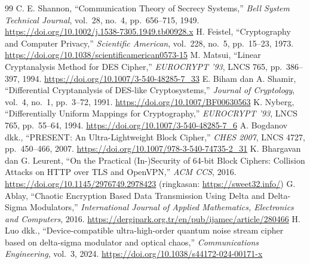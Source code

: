 \begin{thebibliography}{99}
   C. E. Shannon, ``Communication Theory of Secrecy Systems,'' \textit{Bell System Technical Journal}, vol.~28, no.~4, pp.~656--715, 1949. \url{https://doi.org/10.1002/j.1538-7305.1949.tb00928.x}
   H. Feistel, ``Cryptography and Computer Privacy,'' \textit{Scientific American}, vol.~228, no.~5, pp.~15--23, 1973. \url{https://doi.org/10.1038/scientificamerican0573-15}
   M. Matsui, ``Linear Cryptanalysis Method for DES Cipher,'' \textit{EUROCRYPT '93}, LNCS 765, pp.~386--397, 1994. \url{https://doi.org/10.1007/3-540-48285-7_33}
   E. Biham dan A. Shamir, ``Differential Cryptanalysis of DES-like Cryptosystems,'' \textit{Journal of Cryptology}, vol.~4, no.~1, pp.~3--72, 1991. \url{https://doi.org/10.1007/BF00630563}
   K. Nyberg, ``Differentially Uniform Mappings for Cryptography,'' \textit{EUROCRYPT '93}, LNCS 765, pp.~55--64, 1994. \url{https://doi.org/10.1007/3-540-48285-7_6}
   A. Bogdanov dkk., ``PRESENT: An Ultra-Lightweight Block Cipher,'' \textit{CHES 2007}, LNCS 4727, pp.~450--466, 2007. \url{https://doi.org/10.1007/978-3-540-74735-2_31}
   K. Bhargavan dan G. Leurent, ``On the Practical (In-)Security of 64-bit Block Ciphers: Collision Attacks on HTTP over TLS and OpenVPN,'' \textit{ACM CCS}, 2016. \url{https://doi.org/10.1145/2976749.2978423} (ringkasan: \url{https://sweet32.info/})
   G. Ablay, ``Chaotic Encryption Based Data Transmission Using Delta and Delta-Sigma Modulators,'' \textit{International Journal of Applied Mathematics, Electronics and Computers}, 2016. \url{https://dergipark.org.tr/en/pub/ijamec/article/280466}
   H. Luo dkk., ``Device-compatible ultra-high-order quantum noise stream cipher based on delta-sigma modulator and optical chaos,'' \textit{Communications Engineering}, vol.~3, 2024. \url{https://doi.org/10.1038/s44172-024-00171-x}


\end{thebibliography}
